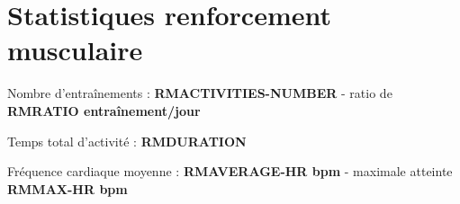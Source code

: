 \documentclass[a4paper,french,11pt]{report}
\begin{document}

\section*{Statistiques renforcement musculaire}
\thispagestyle{empty}


\textbullet Nombre d'entraînements : \textbf{RMACTIVITIES-NUMBER} -
ratio de \textbf{RMRATIO entraînement/jour}

\textbullet Temps total d'activité : \textbf{RMDURATION}

\textbullet Fréquence cardiaque moyenne : \textbf{RMAVERAGE-HR bpm} -
maximale atteinte \textbf{RMMAX-HR bpm}

\end{document}
